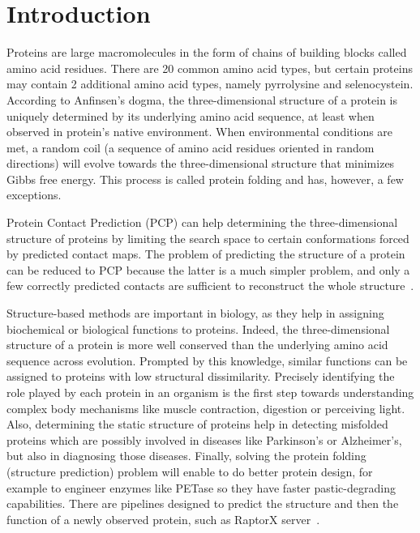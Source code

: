 \chapter{Introduction}

    \setcounter{page}{1}
    \vspace*{0.5cm}

    Proteins are large macromolecules in the form of chains of building blocks called amino acid residues.
    There are 20 common amino acid types, but certain proteins may contain 2 additional amino acid types, namely pyrrolysine and selenocystein.
    According to Anfinsen's dogma, the three-dimensional structure of a protein is uniquely determined by its underlying amino acid sequence,
    at least when observed in protein's native environment. When environmental conditions are met, a random coil (a sequence of amino acid residues
    oriented in random directions) will evolve towards the three-dimensional structure that minimizes Gibbs free energy.
    This process is called protein folding and has, however, a few exceptions.

    Protein Contact Prediction (PCP) can help determining the three-dimensional structure of proteins by limiting the search space to certain conformations
    forced by predicted contact maps. The problem of predicting the structure of a protein can be reduced to PCP because the latter is a much simpler problem,
    and only a few correctly predicted contacts are sufficient to reconstruct the whole structure~\cite{kim2014one}.

    Structure-based methods are important in biology, as they help in assigning biochemical or biological functions to proteins. Indeed, the three-dimensional
    structure of a protein is more well conserved than the underlying amino acid sequence across evolution. Prompted by this knowledge, similar functions
    can be assigned to proteins with low structural dissimilarity. Precisely identifying the role played by each protein in an organism is the first step
    towards understanding complex body mechanisms like muscle contraction, digestion or perceiving light.
    Also, determining the static structure of proteins help in detecting misfolded proteins which are possibly involved in diseases like Parkinson's or
    Alzheimer's, but also in diagnosing those diseases.
    Finally, solving the protein folding (structure prediction) problem will enable to do better protein design, for example to engineer enzymes like PETase
    so they have faster pastic-degrading capabilities.
    There are pipelines designed to predict the structure and then the function of a newly
    observed protein, such as RaptorX server~\cite{peng2011raptorx}.

